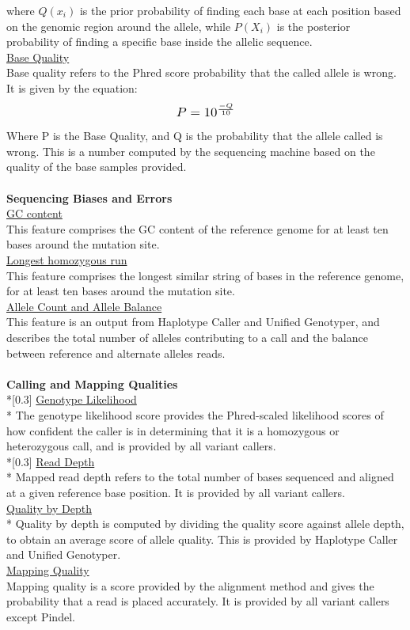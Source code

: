 \documentclass{article}
\begin{document}
where $Q(x_i)$ is the prior probability of finding each base at each position based on the genomic region around the allele, while $P(X_i)$ is the posterior probability of finding a specific base inside the allelic sequence.\\[0.3\baselineskip]
\underline{Base Quality}\\
Base quality refers to the Phred score probability that the called allele is wrong. It is given by the equation:
\[ \scalebox{1.2}{$P=10^{\frac{-Q}{10}}$} \]
Where P is the Base Quality, and Q is the probability that the allele called is wrong. This is a number computed by the sequencing machine based on the quality of the base samples provided.\\\\
\textbf{Sequencing Biases and Errors} \\[0.3\baselineskip]
\underline{GC content}\\
This feature comprises the GC content of the reference genome for at least ten bases around the mutation site.\\[0.3\baselineskip]
\underline{Longest homozygous run}\\
This feature comprises the longest similar string of bases in the reference genome, for at least ten bases around the mutation site.\\[0.3\baselineskip]
\underline{Allele Count and Allele Balance}\\
This feature is an output from Haplotype Caller and Unified Genotyper, and describes the total number of alleles contributing to a call and the balance between reference and alternate alleles reads.\\\\
\textbf{Calling and Mapping Qualities} \\*[0.3\baselineskip]
\underline{Genotype Likelihood}\\*
The genotype likelihood score provides the Phred-scaled likelihood scores of how confident the caller is in determining that it is a homozygous or heterozygous call, and is provided by all variant callers.\\*[0.3\baselineskip]
\underline{Read Depth}\\*
Mapped read depth refers to the total number of bases sequenced and aligned at a given reference base position. It is provided by all variant callers.\\[0.3\baselineskip]
\underline{Quality by Depth}\\*
Quality by depth is computed by dividing the quality score against allele depth, to obtain an average score of allele quality. This is provided by Haplotype Caller and Unified Genotyper.\\[0.3\baselineskip]
\underline{Mapping Quality}\\
Mapping quality is a score provided by the alignment method and gives the probability that a read is placed accurately. It is provided by all variant callers except Pindel.\\
\end{document}
